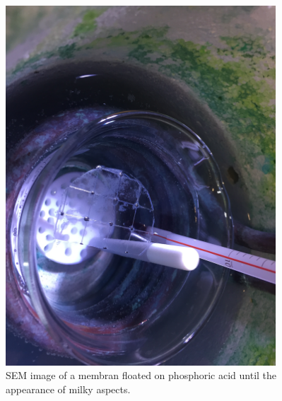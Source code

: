 \documentclass[../thesis.tex]{subfiles}
\begin{document}
        \begin{figure}[tb]
          \includegraphics[width=0.9\textwidth]{images/milky_aspects.JPG}
          \caption{SEM image of a membran floated on phosphoric acid until the appearance of milky aspects.}
          \label{fig:milky-meb}
        \end{figure}
\end{document}
